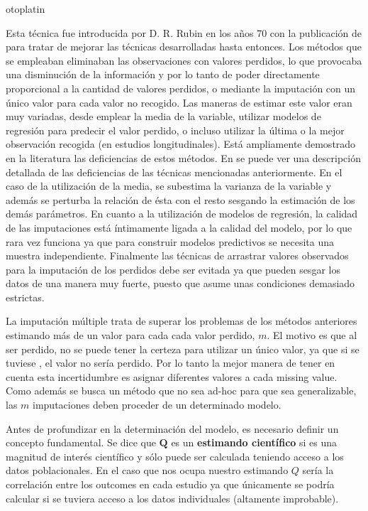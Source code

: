 otoplatin\documentclass[a4paper,openright,12pt]{report}
\begin{document}
Esta técnica fue introducida por D. R. Rubin en los años 70 con la publicación de \cite{Rubin1978}\cite{Rubin1978_2} para tratar de mejorar las técnicas desarrolladas hasta entonces. Los métodos que se empleaban eliminaban las observaciones con valores perdidos, lo que provocaba una disminución de la información y por lo tanto de poder directamente proporcional a la cantidad de valores perdidos, o mediante la imputación con un único valor para cada valor no recogido.
Las maneras de estimar este valor eran muy variadas, desde emplear la media de la variable, utilizar modelos de regresión para predecir el valor perdido, o incluso utilizar la última o la mejor observación recogida (en estudios longitudinales). Está ampliamente demostrado en la literatura las deficiencias de estos métodos. En \cite{VanBuuren2012} se puede ver una descripción detallada de las deficiencias de las técnicas mencionadas anteriormente. En el caso de la utilización de la media, se subestima la varianza de la variable y además se perturba la relación de ésta con el resto sesgando la estimación de los demás parámetros. En cuanto a la utilización de modelos de regresión, la calidad de las imputaciones está íntimamente ligada a la calidad del modelo, por lo que rara vez funciona ya que para construir modelos predictivos se necesita una muestra independiente. Finalmente las técnicas de arrastrar valores observados para la imputación de los perdidos debe ser evitada ya que pueden sesgar los datos de una manera muy fuerte, puesto que asume unas condiciones demasiado estrictas.

La imputación múltiple trata de superar los problemas de los métodos anteriores estimando más de un valor para cada cada valor perdido, $m$. El motivo es que al ser perdido, no se puede tener la certeza para utilizar un único valor, ya que si se tuviese , el valor no sería perdido. Por lo tanto la mejor manera de tener en cuenta esta incertidumbre es asignar diferentes valores a cada missing value. Como además se busca un método que no sea ad-hoc para que sea generalizable, las $m$ imputaciones deben proceder de un determinado modelo\cite{Rubin1978_3}.

Antes de profundizar en la determinación del modelo, es necesario definir un concepto fundamental. Se dice que $\boldsymbol{Q}$ es un \textbf{estimando científico} si es una magnitud de interés científico y sólo puede ser calculada teniendo acceso a los datos poblacionales. En el caso que nos ocupa nuestro estimando $Q$ sería la correlación entre los outcomes en cada estudio ya que únicamente se podría calcular si se tuviera acceso a los datos individuales (altamente improbable). 
\end{document}

